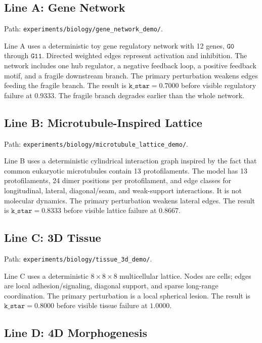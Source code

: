 \documentclass[11pt]{article}
\begin{document}
\subsection{Line A: Gene Network}

Path: \texttt{experiments/biology/gene\_network\_demo/}.

Line A uses a deterministic toy gene regulatory network with 12 genes, \(\texttt{G0}\) through \(\texttt{G11}\). Directed weighted edges represent activation and inhibition. The network includes one hub regulator, a negative feedback loop, a positive feedback motif, and a fragile downstream branch. The primary perturbation weakens edges feeding the fragile branch. The result is \(\texttt{k\_star}=0.7000\) before visible regulatory failure at \(0.9333\). The fragile branch degrades earlier than the whole network.

\subsection{Line B: Microtubule-Inspired Lattice}

Path: \texttt{experiments/biology/microtubule\_lattice\_demo/}.

Line B uses a deterministic cylindrical interaction graph inspired by the fact that common eukaryotic microtubules contain 13 protofilaments. The model has 13 protofilaments, 24 dimer positions per protofilament, and edge classes for longitudinal, lateral, diagonal/seam, and weak-support interactions. It is not molecular dynamics. The primary perturbation weakens lateral edges. The result is \(\texttt{k\_star}=0.8333\) before visible lattice failure at \(0.8667\).

\subsection{Line C: 3D Tissue}

Path: \texttt{experiments/biology/tissue\_3d\_demo/}.

Line C uses a deterministic \(8\times8\times8\) multicellular lattice. Nodes are cells; edges are local adhesion/signaling, diagonal support, and sparse long-range coordination. The primary perturbation is a local spherical lesion. The result is \(\texttt{k\_star}=0.8000\) before visible tissue failure at \(1.0000\).

\subsection{Line D: 4D Morphogenesis}
\end{document}
